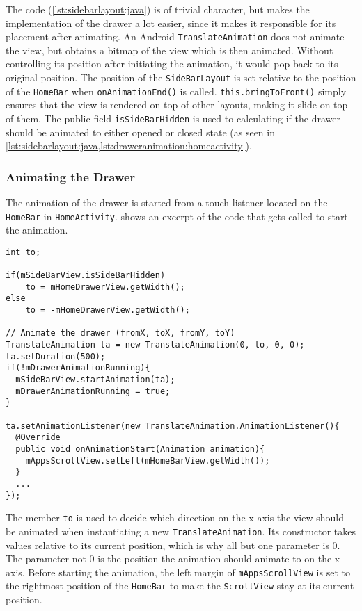 The code (\cref{lst:sidebarlayout:java}) is of trivial character, but makes the implementation of the drawer a lot easier, since it makes it responsible for its placement after animating.
An Android \lstinline|TranslateAnimation| does not animate the view, but obtains a bitmap of the view which is then animated.
Without controlling its position after initiating the animation, it would pop back to its original position.
The position of the \lstinline|SideBarLayout| is set relative to the position of the \lstinline|HomeBar| when \lstinline|onAnimationEnd()| is called.
\lstinline|this.bringToFront()| simply ensures that the view is rendered on top of other layouts, making it slide on top of them.
The public field \lstinline|isSideBarHidden| is used to calculating if the drawer should be animated to either opened or closed state (as seen in \cref{lst:sidebarlayout:java,lst:draweranimation:homeactivity}).

\subsubsection{Animating the Drawer}
The animation of the drawer is started from a touch listener located on the \lstinline|HomeBar| in \lstinline|HomeActivity|.
 shows an excerpt of the code that gets called to start the animation.

\begin{lstlisting}[caption={Excerpt of \lstinline|placeDrawer()| method from the home activity.},label={lst:draweranimation:homeactivity}]
int to;

if(mSideBarView.isSideBarHidden)
    to = mHomeDrawerView.getWidth();
else
    to = -mHomeDrawerView.getWidth();

// Animate the drawer (fromX, toX, fromY, toY)
TranslateAnimation ta = new TranslateAnimation(0, to, 0, 0);
ta.setDuration(500);
if(!mDrawerAnimationRunning){
  mSideBarView.startAnimation(ta);
  mDrawerAnimationRunning = true;
}

ta.setAnimationListener(new TranslateAnimation.AnimationListener(){
  @Override
  public void onAnimationStart(Animation animation){
    mAppsScrollView.setLeft(mHomeBarView.getWidth());
  }
  ...
});
\end{lstlisting}

The member \lstinline|to| is used to decide which direction on the x-axis the view should be animated when instantiating a new \lstinline|TranslateAnimation|.
Its constructor takes values relative to its current position, which is why all but one parameter is 0.
The parameter not 0 is the position the animation should animate to on the x-axis.
Before starting the animation, the left margin of \lstinline|mAppsScrollView| is set to the rightmost position of the \lstinline|HomeBar| to make the \lstinline|ScrollView| stay at its current position.